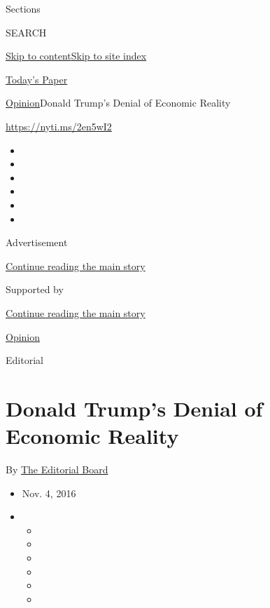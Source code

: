 Sections

SEARCH

\protect\hyperlink{site-content}{Skip to
content}\protect\hyperlink{site-index}{Skip to site index}

\href{https://myaccount.nytimes.com/auth/login?response_type=cookie\&client_id=vi}{}

\href{https://www.nytimes.com/section/todayspaper}{Today's Paper}

\href{/section/opinion}{Opinion}\textbar{}Donald Trump's Denial of
Economic Reality

\url{https://nyti.ms/2en5wI2}

\begin{itemize}
\item
\item
\item
\item
\item
\item
\end{itemize}

Advertisement

\protect\hyperlink{after-top}{Continue reading the main story}

Supported by

\protect\hyperlink{after-sponsor}{Continue reading the main story}

\href{/section/opinion}{Opinion}

Editorial

\hypertarget{donald-trumps-denial-of-economic-reality}{%
\section{Donald Trump's Denial of Economic
Reality}\label{donald-trumps-denial-of-economic-reality}}

By
\href{http://www.nytimes.com/interactive/opinion/editorialboard.html}{The
Editorial Board}

\begin{itemize}
\item
  Nov. 4, 2016
\item
  \begin{itemize}
  \item
  \item
  \item
  \item
  \item
  \item
  \end{itemize}
\end{itemize}


